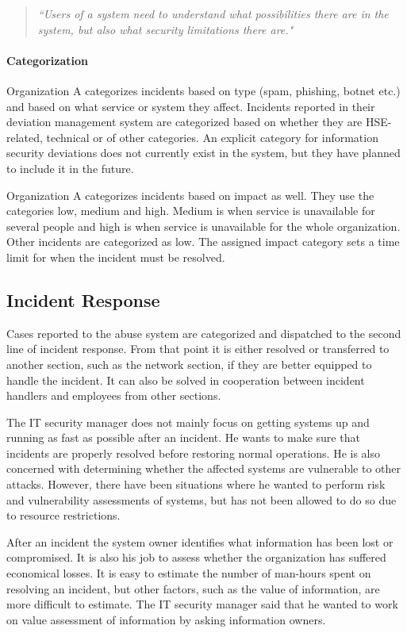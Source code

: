 \begin{quote}
\textit{``Users of a system need to understand what possibilities there are in the system, but also what security limitations there are."} 
\end{quote}

\paragraph{Categorization}
Organization A categorizes incidents based on type (spam, phishing, botnet etc.) and based on what service or system they affect. Incidents reported in their deviation management system are categorized based on whether they are \ac{HSE}-related, technical or of other categories. An explicit category for information security deviations does not currently exist in the system, but they have planned to include it in the future.

Organization A categorizes incidents based on impact as well. They use the categories low, medium and high. Medium is when service is unavailable for several people and high is when service is unavailable for the whole organization. Other incidents are categorized as low. The assigned impact category sets a time limit for when the incident must be resolved.

\subsection{Incident Response}
Cases reported to the abuse system are categorized and dispatched to the second line of incident response. From that point it is either resolved or transferred to another section, such as the network section, if they are better equipped to handle the incident. It can also be solved in cooperation between incident handlers and employees from other sections.

The IT security manager does not mainly focus on getting systems up and running as fast as possible after an incident. He wants to make sure that incidents are properly resolved before restoring normal operations. He is also concerned with determining whether the affected systems are vulnerable to other attacks. However, there have been situations where he wanted to perform risk and vulnerability assessments of systems, but has not been allowed to do so due to resource restrictions.

After an incident the system owner identifies what information has been lost or compromised. It is also his job to assess whether the organization has suffered economical losses. It is easy to estimate the number of man-hours spent on resolving an incident, but other factors, such as the value of information, are more difficult to estimate. The IT security manager said that he wanted to work on value assessment of information by asking information owners.

